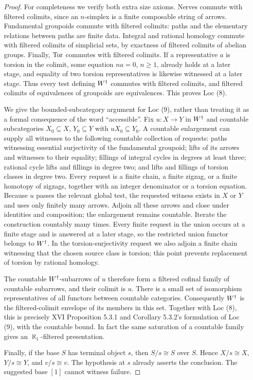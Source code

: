 \begin{proof}
For completeness we verify both extra size axioms. Nerves commute with filtered colimits, since an $n$-simplex is a finite composable string of arrows. Fundamental groupoids commute with filtered colimits: paths and the elementary relations between paths are finite data. Integral and rational homology commute with filtered colimits of simplicial sets, by exactness of filtered colimits of abelian groups. Finally, $\operatorname{Tor}$ commutes with filtered colimits. If a representative $a$ is torsion in the colimit, some equation $na=0$, $n\geq1$, already holds at a later stage, and equality of two torsion representatives is likewise witnessed at a later stage. Thus every test defining ${W^{\dagger}}$ commutes with filtered colimits, and filtered colimits of equivalences of groupoids are equivalences. This proves Loc (8).

We give the bounded-subcategory argument for Loc (9), rather than treating it as a formal consequence of the word ``accessible''. Fix $u:X\to Y$ in ${W^{\dagger}}$ and countable subcategories $X_0\subseteq X$, $Y_0\subseteq Y$ with $uX_0\subseteq Y_0$. A countable enlargement can supply all witnesses to the following countable collection of requests: paths witnessing essential surjectivity of the fundamental groupoid; lifts of its arrows and witnesses to their equality; fillings of integral cycles in degrees at least three; rational cycle lifts and fillings in degree two; and lifts and fillings of torsion classes in degree two. Every request is a finite chain, a finite zigzag, or a finite homotopy of zigzags, together with an integer denominator or a torsion equation. Because $u$ passes the relevant global test, the requested witness exists in $X$ or $Y$ and uses only finitely many arrows. Adjoin all these arrows and close under identities and composition; the enlargement remains countable. Iterate the construction countably many times. Every finite request in the union occurs at a finite stage and is answered at a later stage, so the restricted union functor belongs to ${W^{\dagger}}$. In the torsion-surjectivity request we also adjoin a finite chain witnessing that the chosen source class is torsion; this point prevents replacement of torsion by rational homology.

The countable ${W^{\dagger}}$-subarrows of $u$ therefore form a filtered cofinal family of countable subarrows, and their colimit is $u$. There is a small set of isomorphism representatives of all functors between countable categories. Consequently ${W^{\dagger}}$ is the filtered-colimit envelope of its members in this set. Together with Loc (8), this is precisely XVI Proposition 5.3.1 and Corollary 5.3.2's formulation of Loc (9), with the countable bound. In fact the same saturation of a countable family gives an $\aleph_1$-filtered presentation.

Finally, if the base $S$ has terminal object $s$, then $S/s\cong S$ over $S$. Hence $X/s\cong X$, $Y/s\cong Y$, and $v/s\cong v$. The hypothesis at $s$ already asserts the conclusion. The suggested base $[1]$ cannot witness failure.
\end{proof}

